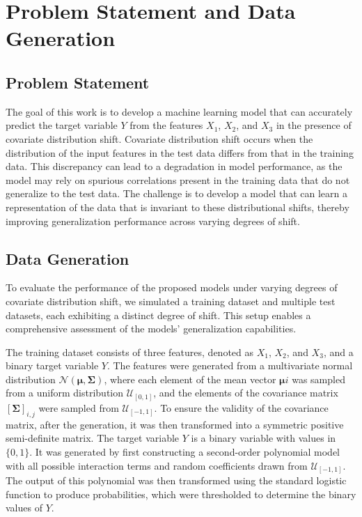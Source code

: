 \chapter{Problem Statement and Data Generation}

\section{Problem Statement}
\label{sec:problem_statement}
The goal of this work is to develop a machine learning model that can accurately predict the target variable $Y$ from the features $X_1$, $X_2$, and $X_3$ in the presence of covariate distribution shift. Covariate distribution shift occurs when the distribution of the input features in the test data differs from that in the training data. This discrepancy can lead to a degradation in model performance, as the model may rely on spurious correlations present in the training data that do not generalize to the test data. The challenge is to develop a model that can learn a representation of the data that is invariant to these distributional shifts, thereby improving generalization performance across varying degrees of shift.

\section{Data Generation}

To evaluate the performance of the proposed models under varying degrees of covariate distribution shift, we simulated a training dataset and multiple test datasets, each exhibiting a distinct degree of shift. 
This setup enables a comprehensive assessment of the models' generalization capabilities.

The training dataset consists of three features, denoted as $X_1$, $X_2$, and $X_3$, and a binary target variable $Y$. The features were generated from a multivariate normal distribution $\mathcal{N}(\boldsymbol{\mu}, \boldsymbol{\Sigma})$, where each element of the mean vector $\boldsymbol{\mu}i$ was sampled from a uniform distribution $\mathcal{U}_{[0, 1]}$, and the elements of the covariance matrix $[\boldsymbol{\Sigma}]_{i,j}$ were sampled from $\mathcal{U}_{[-1, 1]}$. To ensure the validity of the covariance matrix, after the generation, it was then transformed into a symmetric positive semi-definite matrix.
The target variable $Y$ is a binary variable with values in $\{0, 1\}$. It was generated by first constructing a second-order polynomial model with all possible interaction terms and random coefficients drawn from $\mathcal{U}_{[-1, 1]}$. The output of this polynomial was then transformed using the standard logistic function to produce probabilities, which were thresholded to determine the binary values of $Y$.

